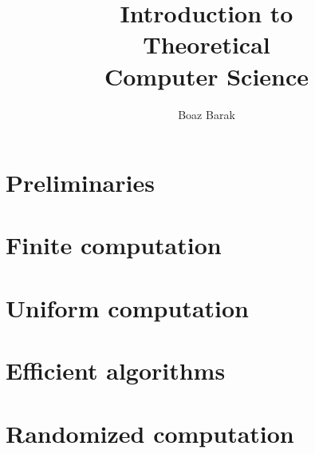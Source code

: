 \documentclass[nofonts, nobib]{tufte-book}
\title{Introduction to \\ \noindent Theoretical \\ \noindent Computer Science}
\author[Boaz Barak]{Boaz Barak}
\begin{document}




\mainmatter


\setcounter{chapter}{-1}


\part*{Preliminaries}










\part{Finite computation}




%

\part{Uniform computation}









\part{Efficient algorithms}






%






\part{Randomized computation}
\end{document}

